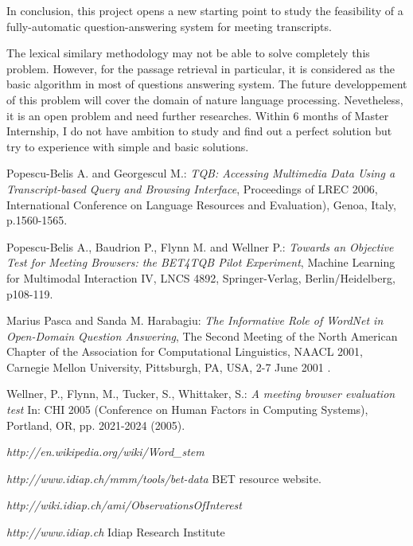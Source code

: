 \documentclass[12pt, a4paper]{report}
\begin{document}
In conclusion, this project opens a new starting point to study the feasibility of a fully-automatic question-answering system for meeting transcripts. 

The lexical similary methodology may not be able to solve completely this problem. However, for the passage retrieval in particular, it is considered as the basic algorithm in most of questions answering system. The future developpement of this problem will cover the domain of nature language processing. Nevetheless, it is an open problem and need further researches. Within 6 months of Master Internship, I do not have ambition to study and find out a perfect solution but try to experience with simple and basic solutions. 

\begin{thebibliography}{12}

 Popescu-Belis A. and Georgescul M.: \emph{TQB: Accessing Multimedia Data Using a Transcript-based Query and Browsing Interface}, Proceedings of LREC 2006, International Conference on Language Resources and Evaluation), Genoa, Italy, p.1560-1565.

 Popescu-Belis A., Baudrion P., Flynn M. and Wellner P.: \emph{Towards an Objective Test for Meeting Browsers: the BET4TQB Pilot Experiment}, Machine Learning for Multimodal Interaction IV, LNCS 4892, Springer-Verlag, Berlin/Heidelberg, p108-119.

 Marius Pasca and Sanda M. Harabagiu: \emph{The Informative Role of WordNet in Open-Domain Question Answering}, The Second Meeting of the North American Chapter of the Association for Computational Linguistics, NAACL 2001, Carnegie Mellon University, Pittsburgh, PA, USA, 2-7 June 2001 .

 Wellner, P., Flynn, M., Tucker, S., Whittaker, S.: \emph{A meeting browser evaluation test} In: CHI 2005 (Conference on Human Factors in Computing Systems), Portland, OR, pp. 2021-2024 (2005).


 \emph{http://en.wikipedia.org/wiki/Word\_stem}

 \emph{http://www.idiap.ch/mmm/tools/bet-data} BET resource website.

 \emph{http://wiki.idiap.ch/ami/ObservationsOfInterest}

 \emph{http://www.idiap.ch} Idiap Research Institute



\end{thebibliography}
\end{document}
